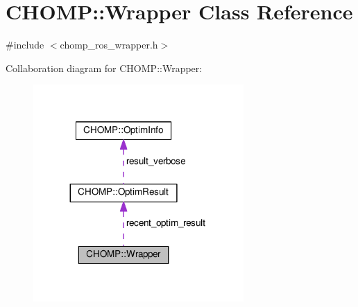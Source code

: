 \hypertarget{class_c_h_o_m_p_1_1_wrapper}{}\section{C\+H\+O\+MP\+:\+:Wrapper Class Reference}
\label{class_c_h_o_m_p_1_1_wrapper}


{\ttfamily \#include $<$chomp\+\_\+ros\+\_\+wrapper.\+h$>$}



Collaboration diagram for C\+H\+O\+MP\+:\+:Wrapper\+:
\nopagebreak
\begin{figure}[H]
\begin{center}
\leavevmode
\includegraphics[width=227pt]{class_c_h_o_m_p_1_1_wrapper__coll__graph}
\end{center}
\end{figure}
